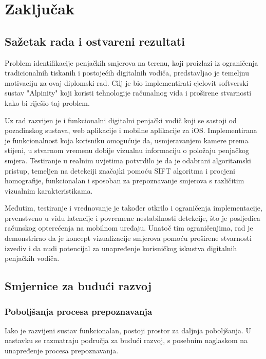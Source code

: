 \chapter{Zaključak}

\section{Sažetak rada i ostvareni rezultati}

Problem identifikacije penjačkih smjerova na terenu, koji proizlazi iz ograničenja tradicionalnih tiskanih i postojećih digitalnih vodiča, predstavljao je temeljnu motivaciju za ovaj diplomski rad. Cilj je bio implementirati cjelovit softverski sustav "Alpinity" koji koristi tehnologije računalnog vida i proširene stvarnosti kako bi riješio taj problem.

Uz rad razvijen je i funkcionalni digitalni penjački vodič koji se sastoji od pozadinskog sustava, web aplikacije i mobilne aplikacije za iOS. Implementirana je funkcionalnost koja korisniku omogućuje da, usmjeravanjem kamere prema stijeni, u stvarnom vremenu dobije vizualnu informaciju o položaju penjačkog smjera. Testiranje u realnim uvjetima potvrdilo je da je odabrani algoritamski pristup, temeljen na detekciji značajki pomoću SIFT algoritma i procjeni homografije, funkcionalan i sposoban za prepoznavanje smjerova s različitim vizualnim karakteristikama.

Međutim, testiranje i vrednovanje je također otkrilo i ograničenja implementacije, prvenstveno u vidu latencije i povremene nestabilnosti detekcije, što je posljedica računskog opterećenja na mobilnom uređaju. Unatoč tim ograničenjima, rad je demonstrirao da je koncept vizualizacije smjerova pomoću proširene stvarnosti izvediv i da nudi potencijal za unapređenje korisničkog iskustva digitalnih penjačkih vodiča.

\section{Smjernice za budući razvoj}

\subsection{Poboljšanja procesa prepoznavanja}

Iako je razvijeni sustav funkcionalan, postoji prostor za daljnja poboljšanja. U nastavku se razmatraju područja za budući razvoj, s posebnim naglaskom na unapređenje procesa prepoznavanja.

